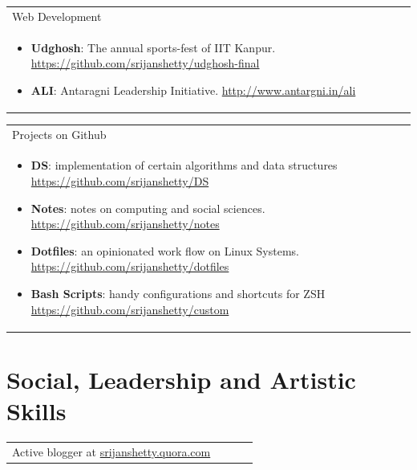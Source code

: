 \documentclass[a4paper,10pt]{article} %
\newcommand{\projectlist}[2]{
    \begin{tabular}{p{\linewidth}}
        \textcolor{NavyBlue}{#1}\\
        \vspace{-0.3cm}
        \footnotesize{#2}
    \end{tabular}
    \vspace{-0.4cm}
}
\newcommand{\skill}[2]{
    \begin{tabular}{p{0.85\linewidth}r}
        #2 & \multicolumn{1}{m{3cm}}{\raggedleft \textsc{#1}}\\
    \end{tabular}
    \vspace{-0.5cm}
}
\begin{document}
\projectlist {Web Development}
             {
                 \begin{itemize}[leftmargin=0.5cm]
                     \item \textbf{Udghosh}: The annual sports-fest of IIT Kanpur.
                         \href{https://github.com/srijanshetty/udghosh-final}{https://github.com/srijanshetty/udghosh-final}
                     \item \textbf{ALI}: Antaragni Leadership Initiative.
                         \href{http://www.antargni.in/ali} {http://www.antargni.in/ali}
                 \end{itemize}
             }

\projectlist {Projects on Github}
             {
                 \begin{itemize}[leftmargin=0.5cm]
                     \item \textbf{DS}: implementation of certain algorithms and data structures
                         \href{https://github.com/srijanshetty/DS} {https://github.com/srijanshetty/DS}
                     \item \textbf{Notes}: notes on computing and social sciences.
                         \href{https://github.com/srijanshetty/notes} {https://github.com/srijanshetty/notes}
                     \item \textbf{Dotfiles}: an opinionated work flow on Linux Systems.
                         \href{https://github.com/srijanshetty/dotfiles} {https://github.com/srijanshetty/dotfiles}
                     \item \textbf{Bash Scripts}: handy configurations and shortcuts for ZSH
                         \href{https://github.com/srijanshetty/custom} {https://github.com/srijanshetty/custom}
                 \end{itemize}
             }


\section {Social, Leadership and Artistic Skills}

\skill {}
       {Active blogger at \href{srijanshetty.quora.com} {srijanshetty.quora.com}}
\end{document}
